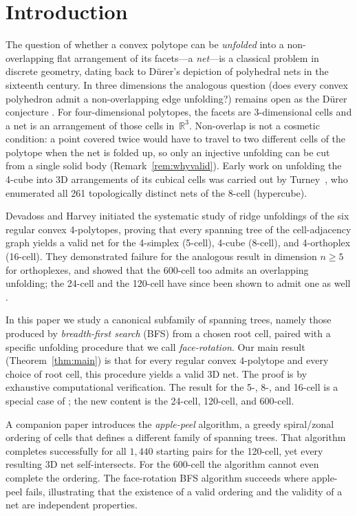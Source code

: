 \documentclass[11pt,letterpaper]{article}
\newcommand{\RR}{\mathbb{R}}
\begin{document}
\section{Introduction}

The question of whether a convex polytope can be \emph{unfolded} into
a non-overlapping flat arrangement of its facets---a \emph{net}---is a
classical problem in discrete geometry, dating back to D\"{u}rer's
depiction of polyhedral nets in the sixteenth century.
In three dimensions the analogous question (does every convex polyhedron
admit a non-overlapping edge unfolding?) remains open as the D\"{u}rer
conjecture \cite{Shephard1975}.
For four-dimensional polytopes, the facets are 3-dimensional cells and
a net is an arrangement of those cells in~$\RR^3$.
Non-overlap is not a cosmetic condition: a point covered twice would
have to travel to two different cells of the polytope when the net is
folded up, so only an injective unfolding can be cut from a single solid
body (Remark~\ref{rem:whyvalid}).
Early work on unfolding the 4-cube into 3D arrangements of its cubical
cells was carried out by Turney~\cite{Turney1984}, who enumerated
all 261 topologically distinct nets of the 8-cell (hypercube).

Devadoss and Harvey \cite{DevadossHarvey2022} initiated the systematic
study of ridge unfoldings of the six regular convex 4-polytopes,
proving that every spanning tree of the cell-adjacency graph yields a
valid net for the 4-simplex (5-cell), 4-cube (8-cell), and 4-orthoplex
(16-cell).
They demonstrated failure for the analogous result in dimension $n\ge5$
for orthoplexes, and showed that the 600-cell too admits an overlapping
unfolding; the 24-cell and the 120-cell have since been shown to admit one
as well \cite{Seamons2026,DevadossHarveyRichter2026}.

In this paper we study a canonical subfamily of spanning trees,
namely those produced by \emph{breadth-first search} (BFS) from a
chosen root cell, paired with a specific unfolding procedure that we
call \emph{face-rotation}.
Our main result (Theorem~\ref{thm:main}) is that for every regular
convex $4$-polytope and every choice of root cell, this procedure yields
a valid 3D net.
The proof is by exhaustive computational verification.
The result for the 5-, 8-, and 16-cell is a special case of
\cite{DevadossHarvey2022}; the new content is the 24-cell, 120-cell,
and 600-cell.

A companion paper \cite{YoshinoChaidee2026} introduces the
\emph{apple-peel} algorithm, a greedy spiral/zonal ordering of cells
that defines a different family of spanning trees.
That algorithm completes successfully for all $1{,}440$ starting pairs
for the 120-cell, yet every resulting 3D net self-intersects.
For the 600-cell the algorithm cannot even complete the ordering.
The face-rotation BFS algorithm succeeds where apple-peel fails,
illustrating that the existence of a valid ordering and the validity
of a net are independent properties.
\end{document}
